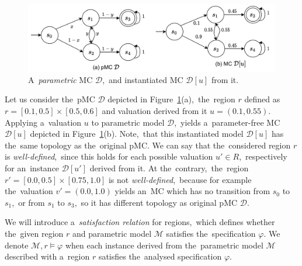 \begin{figure}[h!]
\centering
\includegraphics[width=1.0\textwidth]{figures/param_instance.pdf}
\caption{A~\textit{parametric} MC $\mathcal{D}$,~and instantiated MC $\mathcal{D}[u]$ from it.}%
\label{fig:param_instance}%
\end{figure}

\begin{example}[Region]
Let us consider the~pMC $\mathcal{D}$ depicted in Figure~\ref{fig:param_instance}(a),~the~region $r$ defined as $r = [0.1, 0.5] \times [0.5, 0.6]$ and valuation derived from it $u = (0.1, 0.55)$.
Applying a~valuation $u$ to parametric model $\mathcal{D}$,~yields a~parameter-free MC $\mathcal{D}[u]$ depicted in Figure~\ref{fig:param_instance}(b).
Note,~that this instantiated model $\mathcal{D}[u]$ has the~same topology as the~original pMC.
We can say that the~considered region $r$ is \textit{well-defined},~since this holds for each possible valuation $u' \in R$,~respectively for an~instance $\mathcal{D}[u']$ derived from it.
At the~contrary,~the~region $r' = [0.0, 0.5] \times [0.75, 1.0]$ is not \textit{well-defined},~because for example the~valuation $v' = (0.0, 1.0)$ yields an~MC which has no transition from $s_0$ to $s_1$,~or from $s_1$ to $s_3$,~so it has different topology as original pMC $\mathcal{D}$.
\end{example}

We will introduce a~\textit{satisfaction relation} for regions,~which defines whether the~given region $r$ and parametric model $\mathcal{M}$ satisfies the~specification $\varphi$.
We denote $\mathcal{M}, r \models \varphi$ when each instance derived from the~parametric model $\mathcal{M}$ described with a~region $r$ satisfies the~analysed specification $\varphi$.

